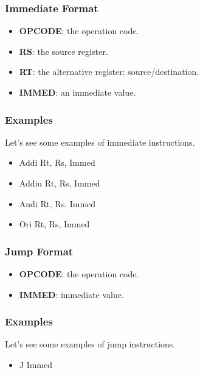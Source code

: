 
\begin{frame}
  \frametitle{Immediate Format}

  \begin{center}
  \end{center}

  \begin{itemize}[<+->]
    \item
      \textbf{OPCODE}: the operation code.
    \item
      \textbf{RS}: the source register.
    \item
      \textbf{RT}: the alternative register: source/destination.
    \item
      \textbf{IMMED}: an immediate value.
  \end{itemize}
\end{frame}


\begin{frame}
  \frametitle{Examples}

  Let's see some examples of immediate instructions.

  \begin{itemize}[<+->]
    \item
      Addi Rt, Rs, Immed
    \item
      Addiu Rt, Rs, Immed
    \item
      Andi Rt, Rs, Immed
    \item
      Ori Rt, Rs, Immed
  \end{itemize}
\end{frame}


\begin{frame}
  \frametitle{Jump Format}

  \begin{center}
  \end{center}

  \begin{itemize}[<+->]
    \item
      \textbf{OPCODE}: the operation code.
    \item
      \textbf{IMMED}: immediate value.
  \end{itemize}
\end{frame}


\begin{frame}
  \frametitle{Examples}

  Let's see some examples of jump instructions.

  \begin{itemize}[<+->]
    \item
      J Immed
  \end{itemize}
\end{frame}

